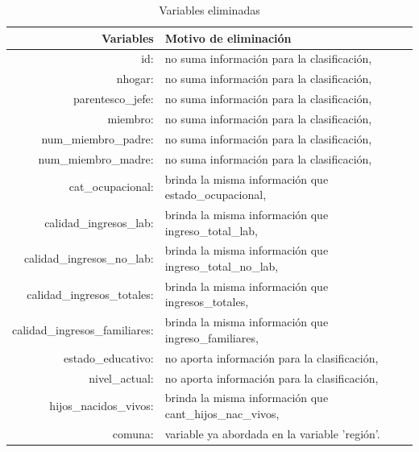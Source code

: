 \documentclass[a4paper]{article}
\begin{document}
        \begin{table}[H]
            \centering
            \begin{tabular}{rl}
                \textbf{Variables}              & \textbf{Motivo de eliminación} \\ \hline
                id:                             & no suma información para la clasificación, \\
                nhogar:                         & no suma información para la clasificación, \\
                parentesco\_jefe:               & no suma información para la clasificación, \\
                miembro:                        & no suma información para la clasificación, \\
                num\_miembro\_padre:            & no suma información para la clasificación, \\
                num\_miembro\_madre:            & no suma información para la clasificación, \\
                cat\_ocupacional:               & brinda la misma información que estado\_ocupacional, \\
                calidad\_ingresos\_lab:         & brinda la misma información que ingreso\_total\_lab, \\
                calidad\_ingresos\_no\_lab:     & brinda la misma información que ingreso\_total\_no\_lab, \\
                calidad\_ingresos\_totales:     & brinda la misma información que ingresos\_totales, \\
                calidad\_ingresos\_familiares:  & brinda la misma información que ingreso\_familiares, \\
                estado\_educativo:              & no aporta información para la clasificación, \\
                nivel\_actual:                  & no aporta información para la clasificación, \\
                hijos\_nacidos\_vivos:          & brinda la misma información que cant\_hijos\_nac\_vivos, \\
                comuna:                         & variable ya abordada en la variable 'región'. \\
            \end{tabular}
        \caption{Variables eliminadas}
        \label{Deleted variables}
    \end{table}
\end{document}
